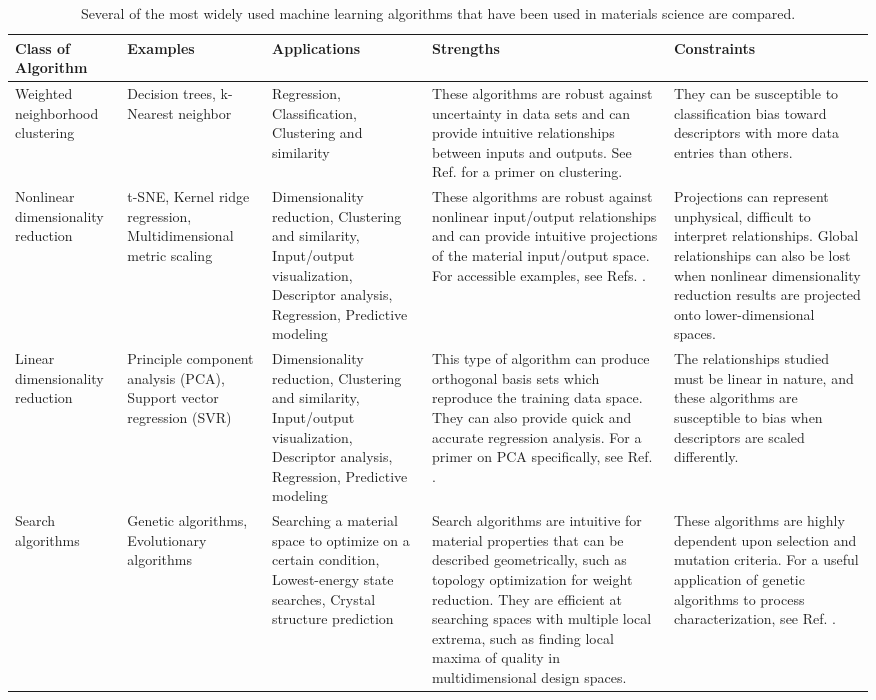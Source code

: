 \begin{table}[t]
\caption{Several of the most widely used machine learning algorithms that have been used in materials science are compared.} \label{ML}
\begin{tabular}{p{2.25cm}|p{2.25cm}|p{3cm}|p{4cm}|p{4cm}}
\raggedright Class of Algorithm & Examples & Applications & Strengths & Constraints \\ \hline \hline
Weighted neighborhood clustering & Decision trees, k-Nearest neighbor & \raggedright Regression, Classification, Clustering and similarity & These algorithms are robust against uncertainty in data sets and can provide intuitive relationships between inputs and outputs. See Ref. \cite{Quinlan1986} for a primer on clustering. & They can be susceptible to classification bias toward descriptors with more data entries than others. \\ \hline

\raggedright Nonlinear dimensionality reduction & \raggedright t-SNE, Kernel ridge regression, Multidimensional metric scaling &\raggedright  Dimensionality reduction, Clustering and similarity, Input/output visualization, Descriptor analysis, Regression, Predictive modeling &\raggedright These algorithms are robust against nonlinear input/output relationships and can provide intuitive projections of the material input/output space. For accessible examples, see Refs. \cite{Tenenbaum2000, Roweis2000}. & Projections can represent unphysical, difficult to interpret relationships. Global relationships can also be lost when nonlinear dimensionality reduction results are projected onto lower-dimensional spaces.\\ \hline

\raggedright Linear dimensionality reduction & \raggedright Principle component analysis (PCA), Support vector regression (SVR) & Dimensionality reduction, Clustering and similarity, Input/output visualization, Descriptor analysis, Regression, Predictive modeling & \raggedright This type of algorithm can produce orthogonal basis sets which reproduce the training data space. They can also provide quick and accurate regression analysis. For a primer on PCA specifically, see Ref. \cite{Bro2014}. & The relationships studied must be linear in nature, and these algorithms are susceptible to bias when descriptors are scaled differently. \\ \hline

Search algorithms & \raggedright Genetic algorithms, Evolutionary algorithms & Searching a material space to optimize on a certain condition, Lowest-energy state searches, Crystal structure prediction &  \raggedright Search algorithms are intuitive for material properties that can be described geometrically, such as topology optimization for weight reduction. They are efficient at searching spaces with multiple local extrema, such as finding local maxima of quality in multidimensional design spaces. &  These algorithms are highly dependent upon selection and mutation criteria. For a useful application of genetic algorithms to process characterization, see Ref. \cite{Grefenstette1986}. \\ 

\end{tabular}
\end{table}


